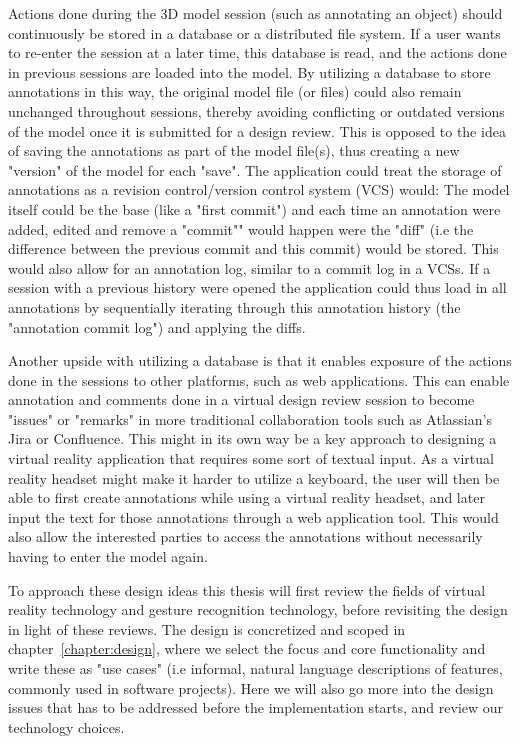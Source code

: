 Actions done during the 3D model session (such as annotating an object) should continuously be stored in a database or a distributed file system. 
If a user wants to re-enter the session at a later time, this database is read, and the actions done in previous sessions are loaded into the model.
By utilizing a database to store annotations in this way, the original model file (or files) could also remain unchanged throughout sessions, thereby avoiding conflicting 
or outdated versions of the model once it is submitted for a design review. This is opposed to the idea of saving the annotations as part of the model file(s), thus creating
a new "version" of the model for each "save".
The application could treat the storage of annotations as a revision control/version control system (VCS) would: The model itself could be the 
base (like a "first commit") and each time an annotation were added, edited and remove a "commit"" would happen were the "diff" (i.e the difference between the previous commit 
and this commit) would be stored. This would also allow for an annotation log, similar to a commit log in a VCSs. 
If a session with a previous history were opened the application could thus load in all annotations by sequentially iterating through
this annotation history (the "annotation commit log") and applying the diffs.

Another upside with utilizing a database is that it enables exposure of the actions done in the sessions to other platforms, such as web applications. 
This can enable annotation and comments done in a virtual design review session to become "issues" or "remarks" in more traditional collaboration tools such as 
Atlassian's Jira or Confluence.
This might in its own way be a key approach to designing a virtual reality application that requires some sort of textual input. As a virtual reality headset might make
it harder to utilize a keyboard, the user will then be able to first create annotations while using a virtual reality headset, and 
later input the text for those annotations through a web application tool. This would also allow the interested parties to access the annotations without necessarily having
to enter the model again. 

To approach these design ideas this thesis will first review the fields of virtual reality technology and gesture recognition technology, before revisiting the design in light
of these reviews. The design is concretized and scoped in chapter~\vref{chapter:design}, where we select the focus and core functionality and write these as 
"use cases" (i.e informal, natural language descriptions of features, commonly used in software projects). Here we will also go more into the design issues that has to be
addressed before the implementation starts, and review our technology choices.  

